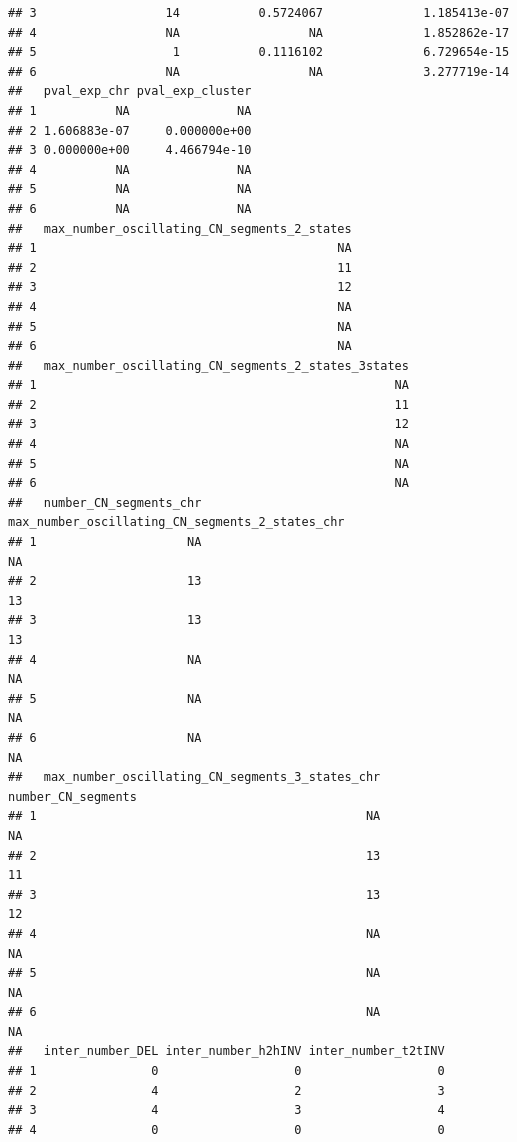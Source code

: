 \documentclass[twoside,a4wide,11pt]{article}\usepackage[]{graphicx}\usepackage[]{color}
\makeatletter
\newenvironment{kframe}{%
 \def\at@end@of@kframe{}%
 \ifinner\ifhmode%
  \def\at@end@of@kframe{\end{minipage}}%
  \begin{minipage}{\columnwidth}%
 \fi\fi%
 \def\FrameCommand##1{\hskip\@totalleftmargin \hskip-\fboxsep
 \colorbox{shadecolor}{##1}\hskip-\fboxsep
     \hskip-\linewidth \hskip-\@totalleftmargin \hskip\columnwidth}%
 \MakeFramed {\advance\hsize-\width
   \@totalleftmargin\z@ \linewidth\hsize
   \@setminipage}}%
 {\par\unskip\endMakeFramed%
 \at@end@of@kframe}
\newenvironment{knitrout}{}{} %
\makeatother
\begin{document}
\begin{knitrout}
\begin{kframe}
\begin{verbatim}
## 3                  14           0.5724067              1.185413e-07
## 4                  NA                  NA              1.852862e-17
## 5                   1           0.1116102              6.729654e-15
## 6                  NA                  NA              3.277719e-14
##   pval_exp_chr pval_exp_cluster
## 1           NA               NA
## 2 1.606883e-07     0.000000e+00
## 3 0.000000e+00     4.466794e-10
## 4           NA               NA
## 5           NA               NA
## 6           NA               NA
##   max_number_oscillating_CN_segments_2_states
## 1                                          NA
## 2                                          11
## 3                                          12
## 4                                          NA
## 5                                          NA
## 6                                          NA
##   max_number_oscillating_CN_segments_2_states_3states
## 1                                                  NA
## 2                                                  11
## 3                                                  12
## 4                                                  NA
## 5                                                  NA
## 6                                                  NA
##   number_CN_segments_chr max_number_oscillating_CN_segments_2_states_chr
## 1                     NA                                              NA
## 2                     13                                              13
## 3                     13                                              13
## 4                     NA                                              NA
## 5                     NA                                              NA
## 6                     NA                                              NA
##   max_number_oscillating_CN_segments_3_states_chr number_CN_segments
## 1                                              NA                 NA
## 2                                              13                 11
## 3                                              13                 12
## 4                                              NA                 NA
## 5                                              NA                 NA
## 6                                              NA                 NA
##   inter_number_DEL inter_number_h2hINV inter_number_t2tINV
## 1                0                   0                   0
## 2                4                   2                   3
## 3                4                   3                   4
## 4                0                   0                   0

\end{verbatim}
\end{kframe}
\end{knitrout}
\end{document}

